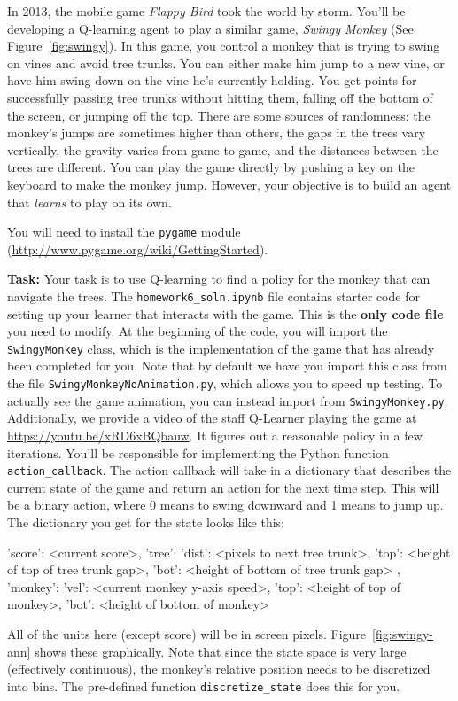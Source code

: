 \documentclass[submit]{harvardml}
\begin{document}
\begin{problem}
  In 2013, the mobile game \emph{Flappy Bird} took the world by storm. You'll be developing a Q-learning agent to play a similar game, \emph{Swingy Monkey} (See Figure~\ref{fig:swingy}).  In this game, you control a monkey that is trying to swing on vines and avoid tree trunks.  You can either make him jump to a new vine, or have him swing down on the vine he's currently holding.  You get points for successfully passing tree trunks without hitting them, falling off the bottom of the screen, or jumping off the top.  There are some sources of randomness: the monkey's jumps are sometimes higher than others, the gaps in the trees vary vertically, the gravity varies from game to game, and the distances between the trees are different.  You can play the game directly by pushing a key on the keyboard to make the monkey jump.  However, your objective is to build an agent that \emph{learns} to play on its own. 
  
   You will need to install the \verb|pygame| module
  (\url{http://www.pygame.org/wiki/GettingStarted}).
  

\textbf{Task:}
Your task is to use Q-learning to find a policy for the monkey that can navigate the trees.  The \verb|homework6_soln.ipynb| file contains starter code for setting up your learner that interacts with the game. This is the \textbf{only code file} you need to modify. At the beginning of the code, you will import the \verb|SwingyMonkey| class, which is the implementation of the game that has already been completed for you. Note that by default we have you import this class from the file \verb|SwingyMonkeyNoAnimation.py|, which allows you to speed up testing. To actually see the game animation, you can instead import from \verb|SwingyMonkey.py|. Additionally, we provide a video of the staff Q-Learner playing the game at \url{https://youtu.be/xRD6xBQbauw}.  It figures out a reasonable policy in a few iterations.
You'll be responsible for implementing the Python function  \verb|action_callback|. The action callback will take in a dictionary that describes the current state of the game and return an action for the next time step.  This will be a binary action, where 0 means to swing downward and 1 means to jump up.  The dictionary you get for the state looks like this:
\begin{csv}
{ 'score': <current score>,
  'tree': { 'dist': <pixels to next tree trunk>,
            'top':  <height of top of tree trunk gap>,
            'bot':  <height of bottom of tree trunk gap> },
  'monkey': { 'vel': <current monkey y-axis speed>,
              'top': <height of top of monkey>,
              'bot': <height of bottom of monkey> }}
\end{csv}
All of the units here (except score) will be in screen pixels. Figure~\ref{fig:swingy-ann} shows these graphically. 
Note that since the state space is very large (effectively continuous), the monkey's relative position needs to be discretized into bins. The pre-defined function \verb|discretize_state| does this for you.


\end{problem}
\end{document}
